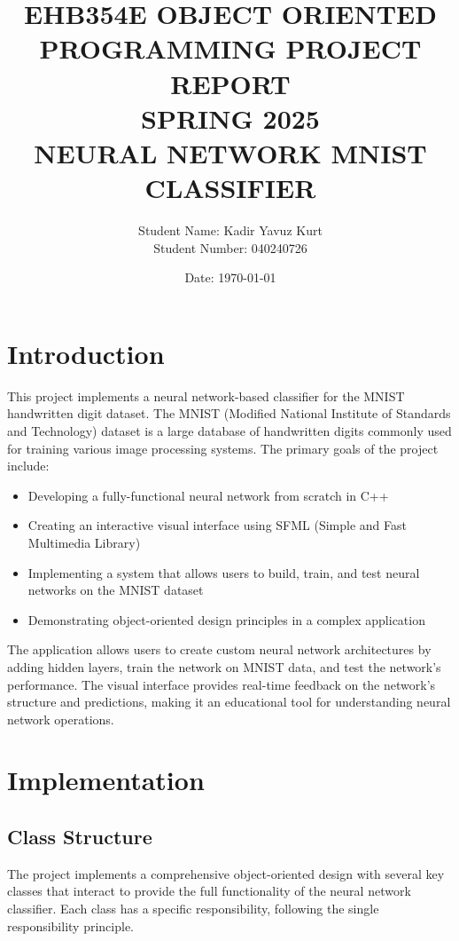\documentclass[12pt]{article}
\title{EHB354E OBJECT ORIENTED PROGRAMMING PROJECT REPORT\\
SPRING 2025\\[2cm]
{\Large NEURAL NETWORK MNIST CLASSIFIER}\\[7cm]}
\author{Student Name: Kadir Yavuz Kurt \\
Student Number: 040240726}
\date{Date: \today}
\begin{document}
\maketitle
\newpage

\tableofcontents
\newpage

\section{Introduction}

This project implements a neural network-based classifier for the MNIST handwritten digit dataset. The MNIST (Modified National Institute of Standards and Technology) dataset is a large database of handwritten digits commonly used for training various image processing systems. The primary goals of the project include:

\begin{itemize}
    \item Developing a fully-functional neural network from scratch in C++
    \item Creating an interactive visual interface using SFML (Simple and Fast Multimedia Library)
    \item Implementing a system that allows users to build, train, and test neural networks on the MNIST dataset
    \item Demonstrating object-oriented design principles in a complex application
\end{itemize}

The application allows users to create custom neural network architectures by adding hidden layers, train the network on MNIST data, and test the network's performance. The visual interface provides real-time feedback on the network's structure and predictions, making it an educational tool for understanding neural network operations.

\section{Implementation}

\subsection{Class Structure}

The project implements a comprehensive object-oriented design with several key classes that interact to provide the full functionality of the neural network classifier. Each class has a specific responsibility, following the single responsibility principle.
\end{document}
